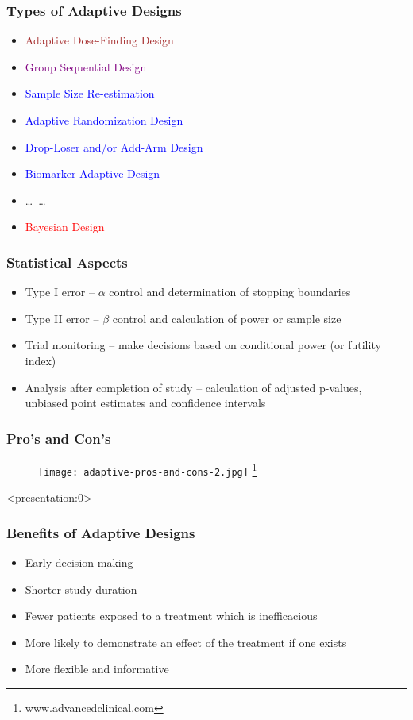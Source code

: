 \documentclass{beamer}
\begin{document}
\begin{frame}
	\frametitle{Types of Adaptive Designs}	
	\begin{itemize}
		\item \textcolor{brown}{Adaptive Dose-Finding Design}
		\item \textcolor{purple}{Group Sequential Design} 
		\item \textcolor{blue}{Sample Size Re-estimation}
		\item \textcolor{blue}{Adaptive Randomization Design}
		\item \textcolor{blue}{Drop-Loser and/or Add-Arm Design}
		\item \textcolor{blue}{Biomarker-Adaptive Design}
	    \item \ldots\ \ldots
	    \item \textcolor{red}{Bayesian Design}
	\end{itemize}	
\end{frame}
\begin{frame}
	\frametitle{Statistical Aspects}
	\begin{itemize}
		\item Type I error --  $\alpha$ control and determination of stopping boundaries
		\item Type II error -- $\beta$ control and calculation of power or sample size 
		\item Trial monitoring -- make decisions based on conditional power (or futility index)
		\item Analysis after completion of study -- calculation of adjusted p-values, unbiased point estimates and confidence intervals
	\end{itemize}
\end{frame}
\begin{frame}
	\frametitle{Pro's and Con's}
	\begin{figure}
		\begin{center}
			\texttt{[image: adaptive-pros-and-cons-2.jpg]}
			\footnote{www.advancedclinical.com}
		\end{center}
	\end{figure}	
\end{frame}
\begin{frame}<presentation:0>
    \frametitle{Benefits of Adaptive Designs}  
   \begin{itemize}
      \item Early decision making
      \item Shorter study duration
      \item Fewer patients exposed to a treatment which is inefficacious
      \item More likely to demonstrate an effect of the treatment if one exists
      \item More flexible and informative           
    \end{itemize}
\end{frame}
\addtocounter{framenumber}{-1}
\end{document}

